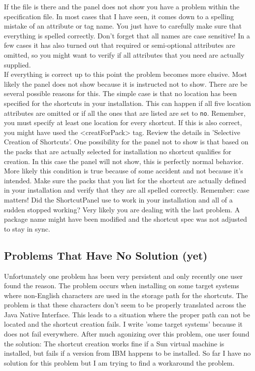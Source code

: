 If the file is there and the panel does not show you have a problem
within the specification file. In most cases that I have seen, it comes
down to a spelling mistake of an attribute or tag name. You just have to
carefully make sure that everything is spelled correctly. Don't forget
that all names are case sensitive! In a few cases it has also turned out
that required or semi-optional attributes are omitted, so you might want
to verify if all attributes that you need are actually supplied.\\

If everything is correct up to this point the problem becomes more
elusive.  Most likely the panel does not show because it is instructed
not to show. There are be several possible reasons for this. The simple
case is that no location has been specified for the shortcuts in your
installation. This can happen if all five location attributes are
omitted or if all the ones that are listed are set to \texttt{no}.
Remember, you must specify at least one location for every shortcut. If
this is also correct, you might have used the <creatForPack> tag. Review
the details in 'Selective Creation of Shortcuts'. One possibility for
the panel not to show is that based on the packs that are actually
selected for installation no shortcut qualifies for creation. In this
case the panel will not show, this is perfectly normal behavior. More
likely this condition is true because of some accident and not because
it's intended. Make sure the packs that you list for the shortcut are
actually defined in your installation and verify that they are all
spelled correctly. Remember: case matters! Did the ShortcutPanel use to
work in your installation and all of a sudden stopped working? Very
likely you are dealing with the last problem. A package name might have
been modified and the shortcut spec was not adjusted to stay in sync.\\

\subsection{Problems That Have No Solution (yet)}

Unfortunately one problem has been very persistent and only recently one
user found the reason. The problem occurs when installing on some target
systems where non-English characters are used in the storage path for
the shortcuts. The problem is that these characters don't seem to be
properly translated across the Java Native Interface. This leads to a
situation where the proper path can not be located and the shortcut
creation fails. I write 'some target systems' because it does not fail
everywhere. After much agonizing over this problem, one user found the
solution: The shortcut creation works fine if a Sun virtual machine is
installed, but fails if a version from IBM happens to be installed. So
far I have no solution for this problem but I am trying to find a
workaround the problem.\\


